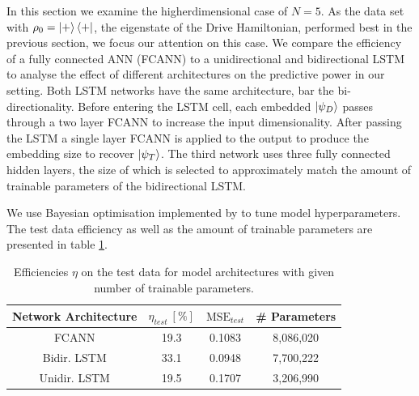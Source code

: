 In this section we examine the higherdimensional case of $N=5$.
As the data set with $\rho_0 = \ket{+} \bra{+}$, the eigenstate of the Drive Hamiltonian, performed best in the previous section, we focus our attention on this case.
We compare the efficiency of a fully connected ANN (FCANN) to a unidirectional and bidirectional LSTM to analyse the effect of different architectures on the predictive power in our setting.
Both LSTM networks have the same architecture, bar the bi-directionality.
Before entering the LSTM cell, each embedded $\ket{\psi_D}$ passes through a two layer FCANN to increase the input dimensionality. 
After passing the LSTM a single layer FCANN is applied to the output to produce the embedding size to recover $\ket{\psi_T}$.
The third network uses three fully connected hidden layers, the size of which is selected to approximately match the amount of trainable parameters of the bidirectional LSTM.

We use Bayesian optimisation implemented by \cite{wandb} to tune model hyperparameters.
The test data efficiency as well as the amount of trainable parameters are presented in table \ref{n5efftable}.

\begin{table}[h]
	\centering
	\begin{tabular}{ c | c | c | c}
		Network Architecture & $\eta_{test} \ [\%]$ & $\mathrm{MSE}_{test}$ & \# Parameters \\
		\hline
		FCANN & 19.3 & 0.1083 & 8,086,020 \\
		Bidir. LSTM & 33.1 & 0.0948 & 7,700,222 \\
		Unidir. LSTM & 19.5 & 0.1707 & 3,206,990\\
	\end{tabular}
	\caption{Efficiencies $\eta$ on the test data for model architectures with given number of trainable parameters.}
	\label{n5efftable}
\end{table}

